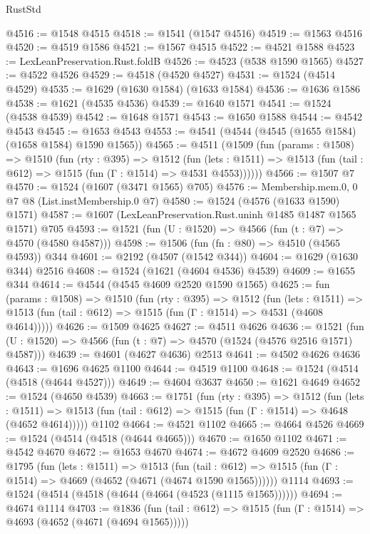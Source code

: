 \begin{lexlean}{RustStd}
\begin{coremodule}
@4516 := @1548 @4515
@4518 := @1541 (@1547 @4516)
@4519 := @1563 @4516
@4520 := @4519 @1586
@4521 := @1567 @4515
@4522 := @4521 @1588
@4523 := LexLeanPreservation.Rust.foldB
@4526 := @4523 (@538 @1590 @1565)
@4527 := @4522 @4526
@4529 := @4518 (@4520 @4527)
@4531 := @1524 (@4514 @4529)
@4535 := @1629 (@1630 @1584) (@1633 @1584)
@4536 := @1636 @1586
@4538 := @1621 (@4535 @4536)
@4539 := @1640 @1571
@4541 := @1524 (@4538 @4539)
@4542 := @1648 @1571
@4543 := @1650 @1588
@4544 := @4542 @4543
@4545 := @1653 @4543
@4553 := @4541 (@4544 (@4545 (@1655 @1584) (@1658 @1584) @1590 @1565))
@4565 := @4511
    (@1509
      (fun (params : @1508) =>
      @1510
        (fun (rty : @395) =>
        @1512
          (fun (lets : @1511) =>
          @1513 (fun (tail : @612) => @1515 (fun (Γ : @1514) => @4531 @4553))))))
@4566 := @1507 @7
@4570 := @1524 (@1607 (@3471 @1565) @705)
@4576 := Membership.mem.{0, 0} @7 @8 (List.instMembership.{0} @7)
@4580 := @1524 (@4576 (@1633 @1590) @1571)
@4587 := @1607 (LexLeanPreservation.Rust.uninh @1485 @1487 @1565 @1571) @705
@4593 := @1521 (fun (U : @1520) => @4566 (fun (t : @7) => @4570 (@4580 @4587)))
@4598 := @1506 (fun (fn : @80) => @4510 (@4565 @4593)) @344
@4601 := @2192 (@4507 (@1542 @344))
@4604 := @1629 (@1630 @344) @2516
@4608 := @1524 (@1621 (@4604 @4536) @4539)
@4609 := @1655 @344
@4614 := @4544 (@4545 @4609 @2520 @1590 @1565)
@4625 := fun (params : @1508) =>
  @1510
    (fun (rty : @395) =>
    @1512
      (fun (lets : @1511) =>
      @1513 (fun (tail : @612) => @1515 (fun (Γ : @1514) => @4531 (@4608 @4614)))))
@4626 := @1509 @4625
@4627 := @4511 @4626
@4636 := @1521 (fun (U : @1520) => @4566 (fun (t : @7) => @4570 (@1524 (@4576 @2516 @1571) @4587)))
@4639 := @4601 (@4627 @4636) @2513
@4641 := @4502 @4626 @4636
@4643 := @1696 @4625 @1100
@4644 := @4519 @1100
@4648 := @1524 (@4514 (@4518 (@4644 @4527)))
@4649 := @4604 @3637
@4650 := @1621 @4649
@4652 := @1524 (@4650 @4539)
@4663 := @1751
    (fun (rty : @395) =>
    @1512
      (fun (lets : @1511) =>
      @1513 (fun (tail : @612) => @1515 (fun (Γ : @1514) => @4648 (@4652 @4614)))))
    @1102
@4664 := @4521 @1102
@4665 := @4664 @4526
@4669 := @1524 (@4514 (@4518 (@4644 @4665)))
@4670 := @1650 @1102
@4671 := @4542 @4670
@4672 := @1653 @4670
@4674 := @4672 @4609 @2520
@4686 := @1795
    (fun (lets : @1511) =>
    @1513
      (fun (tail : @612) => @1515 (fun (Γ : @1514) => @4669 (@4652 (@4671 (@4674 @1590 @1565))))))
    @1114
@4693 := @1524 (@4514 (@4518 (@4644 (@4664 (@4523 (@1115 @1565))))))
@4694 := @4674 @1114
@4703 := @1836
    (fun (tail : @612) => @1515 (fun (Γ : @1514) => @4693 (@4652 (@4671 (@4694 @1565)))))

\end{coremodule}
\end{lexlean}
